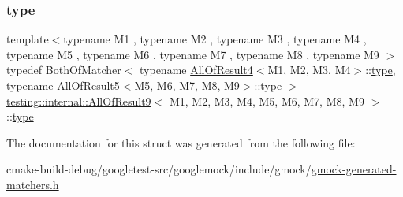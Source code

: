 \subsubsection{\texorpdfstring{type}{type}}
{\footnotesize\ttfamily template$<$typename M1 , typename M2 , typename M3 , typename M4 , typename M5 , typename M6 , typename M7 , typename M8 , typename M9 $>$ \\
typedef Both\+Of\+Matcher$<$ typename \mbox{\hyperlink{structtesting_1_1internal_1_1AllOfResult4}{All\+Of\+Result4}}$<$M1, M2, M3, M4$>$\+::\mbox{\hyperlink{structtesting_1_1internal_1_1AllOfResult9_ade56e18d2e0b745968b87fc394710edc}{type}}, typename \mbox{\hyperlink{structtesting_1_1internal_1_1AllOfResult5}{All\+Of\+Result5}}$<$M5, M6, M7, M8, M9$>$\+::\mbox{\hyperlink{structtesting_1_1internal_1_1AllOfResult9_ade56e18d2e0b745968b87fc394710edc}{type}} $>$ \mbox{\hyperlink{structtesting_1_1internal_1_1AllOfResult9}{testing\+::internal\+::\+All\+Of\+Result9}}$<$ M1, M2, M3, M4, M5, M6, M7, M8, M9 $>$\+::\mbox{\hyperlink{structtesting_1_1internal_1_1AllOfResult9_ade56e18d2e0b745968b87fc394710edc}{type}}}



The documentation for this struct was generated from the following file\+:\begin{DoxyCompactItemize}
\item 
cmake-\/build-\/debug/googletest-\/src/googlemock/include/gmock/\mbox{\hyperlink{gmock-generated-matchers_8h}{gmock-\/generated-\/matchers.\+h}}\end{DoxyCompactItemize}
